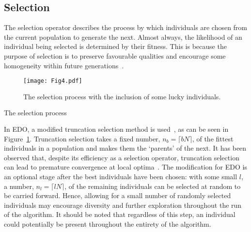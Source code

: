 \documentclass[11pt]{article}
\newlength{\imgwidth}
\newcommand{\balg}[1][htbp]{%
    \begin{algorithm}[#1]\DontPrintSemicolon
}
\newcommand{\ealg}{%
    \end{algorithm}
}
\begin{document}
\subsection{Selection}

The selection operator describes the process by which individuals are chosen
from the current population to generate the next. Almost always, the likelihood
of an individual being selected is determined by their fitness. This is because
the purpose of selection is to preserve favourable qualities and encourage some
homogeneity within future generations~\cite{Back1994}.

\begin{figure}[htbp]
    \centering
    \texttt{[image: Fig4.pdf]}
    \caption{%
        The selection process with the inclusion of some lucky individuals.
    }\label{fig:selection}
\end{figure}

\balg%

\caption{The selection process}
\ealg%

In EDO, a modified truncation selection method is used~\cite{Jebari2013}, as can
be seen in Figure~\ref{fig:selection}. Truncation selection takes a fixed
number, \(n_b = \lceil bN\rceil\), of the fittest individuals in a population
and makes them the `parents' of the next. It has been observed that, despite
its efficiency as a selection operator, truncation selection can lead to
premature convergence at local optima~\cite{Jebari2013,Motoki2002}. The
modification for EDO is an optional stage after the best individuals have been
chosen: with some small \(l\), a number, \(n_l = \lceil lN\rceil\), of the
remaining individuals can be selected at random to be carried forward. Hence,
allowing for a small number of randomly selected individuals may encourage
diversity and further exploration throughout the run of the algorithm. It should
be noted that regardless of this step, an individual could potentially be
present throughout the entirety of the algorithm.
\end{document}
